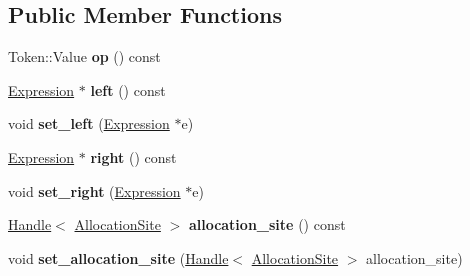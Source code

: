 \subsection*{Public Member Functions}
\begin{DoxyCompactItemize}
\item 
Token\+::\+Value {\bfseries op} () const \hypertarget{classv8_1_1internal_1_1_binary_operation_ab1744c4a0aac206822bcc199e7e809bb}{}\label{classv8_1_1internal_1_1_binary_operation_ab1744c4a0aac206822bcc199e7e809bb}

\item 
\hyperlink{classv8_1_1internal_1_1_expression}{Expression} $\ast$ {\bfseries left} () const \hypertarget{classv8_1_1internal_1_1_binary_operation_aac901f63ebfc9715d92d0e09410ab229}{}\label{classv8_1_1internal_1_1_binary_operation_aac901f63ebfc9715d92d0e09410ab229}

\item 
void {\bfseries set\+\_\+left} (\hyperlink{classv8_1_1internal_1_1_expression}{Expression} $\ast$e)\hypertarget{classv8_1_1internal_1_1_binary_operation_a78719db20c475e4f3650e6a7f8a46778}{}\label{classv8_1_1internal_1_1_binary_operation_a78719db20c475e4f3650e6a7f8a46778}

\item 
\hyperlink{classv8_1_1internal_1_1_expression}{Expression} $\ast$ {\bfseries right} () const \hypertarget{classv8_1_1internal_1_1_binary_operation_a1cceac7ed04bf43df63aca93f69f31ab}{}\label{classv8_1_1internal_1_1_binary_operation_a1cceac7ed04bf43df63aca93f69f31ab}

\item 
void {\bfseries set\+\_\+right} (\hyperlink{classv8_1_1internal_1_1_expression}{Expression} $\ast$e)\hypertarget{classv8_1_1internal_1_1_binary_operation_a92881b73b12c7d11590bc73c38de6a3f}{}\label{classv8_1_1internal_1_1_binary_operation_a92881b73b12c7d11590bc73c38de6a3f}

\item 
\hyperlink{classv8_1_1internal_1_1_handle}{Handle}$<$ \hyperlink{classv8_1_1internal_1_1_allocation_site}{Allocation\+Site} $>$ {\bfseries allocation\+\_\+site} () const \hypertarget{classv8_1_1internal_1_1_binary_operation_aa33650148d2ac9a3315f9e812a62d4f0}{}\label{classv8_1_1internal_1_1_binary_operation_aa33650148d2ac9a3315f9e812a62d4f0}

\item 
void {\bfseries set\+\_\+allocation\+\_\+site} (\hyperlink{classv8_1_1internal_1_1_handle}{Handle}$<$ \hyperlink{classv8_1_1internal_1_1_allocation_site}{Allocation\+Site} $>$ allocation\+\_\+site)\hypertarget{classv8_1_1internal_1_1_binary_operation_aaf70f7984e02c25513a9071edebc721e}{}\label{classv8_1_1internal_1_1_binary_operation_aaf70f7984e02c25513a9071edebc721e}


\end{DoxyCompactItemize}
